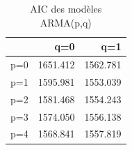 \begin{table}[!h]
\centering
\caption{AIC des modèles ARMA(p,q)}
\centering
\begin{tabular}[t]{lrr}
\toprule
  & q=0 & q=1\\
\midrule
p=0 & 1651.412 & 1562.781\\
p=1 & 1595.981 & 1553.039\\
p=2 & 1581.468 & 1554.243\\
p=3 & 1574.050 & 1556.138\\
p=4 & 1568.841 & 1557.819\\
\bottomrule
\end{tabular}
\end{table}
